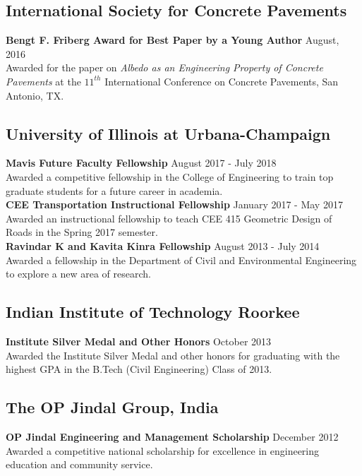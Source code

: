 \documentclass[12pt]{article}
\begin{document}
\subsection*{International Society for Concrete Pavements}
\textbf{Bengt F. Friberg Award for Best Paper by a Young Author} \hfill August, 2016 \\
Awarded for the paper on \textit{Albedo as an Engineering Property of Concrete Pavements} at the $11^{th}$ International Conference on Concrete Pavements, San Antonio, TX. \\

\subsection*{University of Illinois at Urbana-Champaign} 
\textbf{Mavis Future Faculty Fellowship} \hfill August 2017 - July 2018 \\
Awarded a competitive fellowship in the College of Engineering to train top graduate students for a future career in academia. \\

\textbf{CEE Transportation Instructional Fellowship} \hfill January 2017 - May 2017 \\
Awarded an instructional fellowship to teach CEE 415 Geometric Design of Roads in the Spring 2017 semester. \\

\textbf{Ravindar K and Kavita Kinra Fellowship} \hfill August 2013 - July 2014 \\
Awarded a fellowship in the Department of Civil and Environmental Engineering to explore a new area of research. \\

\subsection*{Indian Institute of Technology Roorkee} 
\textbf{Institute Silver Medal and Other Honors} \hfill October 2013 \\
Awarded the Institute Silver Medal and other honors for graduating with the highest GPA in the B.Tech (Civil Engineering) Class of 2013. \\

\subsection*{The OP Jindal Group, India} 
\textbf{OP Jindal Engineering and Management Scholarship} \hfill December 2012 \\
Awarded a competitive national scholarship for excellence in engineering education and community service. \\
\end{document}
